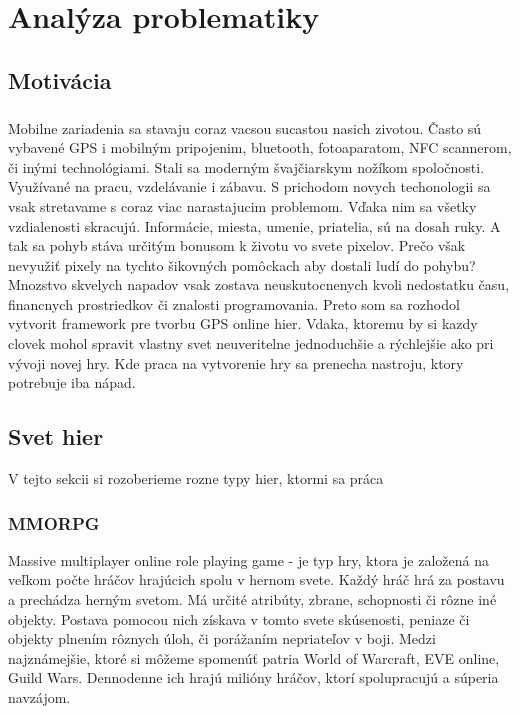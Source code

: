 \chapter{Analýza problematiky}
\section{Motivácia}
\paragraph{}
Mobilne zariadenia sa stavaju coraz vacsou sucastou nasich zivotou. Často sú vybavené GPS i mobilným pripojenim, bluetooth, fotoaparatom, NFC scannerom, či inými technológiami. Stali sa moderným švajčiarskym nožíkom spoločnosti. Využívané na pracu, vzdelávanie i zábavu. S prichodom novych techonologii sa vsak stretavame s coraz viac narastajucim problemom. Vďaka nim sa všetky vzdialenosti skracujú. Informácie, miesta, umenie, priatelia, sú na dosah ruky. A tak sa pohyb stáva určitým bonusom k životu vo svete pixelov. Prečo však nevyužiť pixely na tychto šikovných pomôckach aby dostali ludí do pohybu?\\
Mnozstvo skvelych napadov vsak zostava neuskutocnenych kvoli nedostatku času, financnych prostriedkov či znalosti programovania. Preto som sa rozhodol vytvorit framework pre tvorbu GPS online hier. Vdaka, ktoremu by si kazdy clovek mohol spravit vlastny svet neuveritelne jednoduchšie a rýchlejšie ako pri vývoji novej hry. Kde praca na vytvorenie hry sa prenecha nastroju, ktory potrebuje iba nápad.

\section{Svet hier}
V tejto sekcii si rozoberieme rozne typy hier, ktormi sa práca

\subsection{MMORPG}
Massive multiplayer online role playing game - je typ hry, ktora je založená na veľkom počte hráčov hrajúcich spolu v hernom svete. Každý hráč hrá za postavu a prechádza herným svetom. Má určité atribúty, zbrane, schopnosti či rôzne iné objekty. Postava pomocou nich získava v tomto svete skúsenosti, peniaze či objekty plnením rôznych úloh, či porážaním nepriateľov v boji. 
Medzi najznámejšie, ktoré si môžeme spomenúť patria World of Warcraft, EVE online, Guild Wars. Dennodenne ich hrajú milióny hráčov, ktorí spolupracujú a súperia navzájom.

